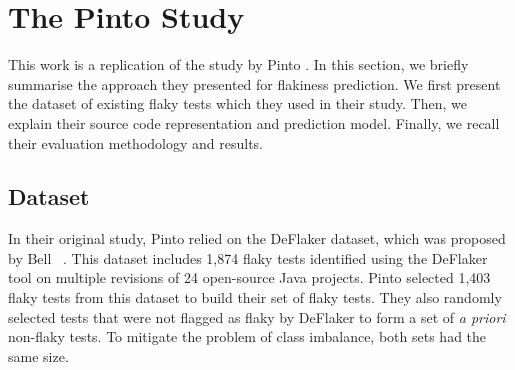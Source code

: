 \section{The Pinto Study}
\label{sec:replication-pinto}


This work is a replication of the study by Pinto \etal \cite{Pinto2020}. 
In this section, we briefly summarise the approach they presented for flakiness prediction. 
We first present the dataset of existing flaky tests which they used in their study. Then, we explain their source code representation and prediction model. 
Finally, we recall their evaluation methodology and results. 


\subsection{Dataset}
In their original study, Pinto \etal 
relied on the DeFlaker dataset, which was proposed by Bell \etal~\cite{Bell2018}. 
This dataset includes 1,874 flaky tests identified using the DeFlaker tool on multiple revisions of 24 open-source Java projects.
Pinto \etal selected 1,403 flaky tests from this dataset to build their set of flaky tests.
They also randomly selected tests that were not flagged as flaky by DeFlaker to form a set of \textit{a priori} non-flaky tests. 
To mitigate the problem of class imbalance, both sets had the same size. 

